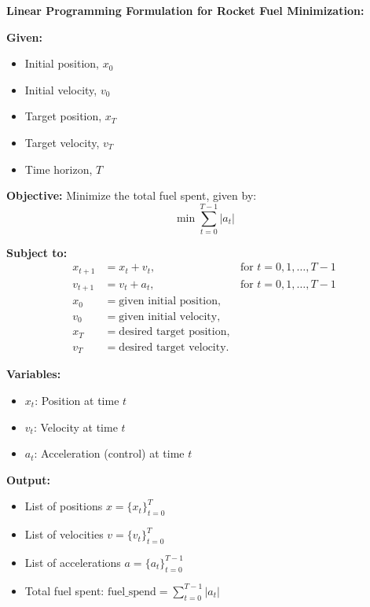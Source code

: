 \documentclass{article}
\begin{document}
\textbf{Linear Programming Formulation for Rocket Fuel Minimization:}

\textbf{Given:}
\begin{itemize}
    \item Initial position, \( x_0 \)
    \item Initial velocity, \( v_0 \)
    \item Target position, \( x_T \)
    \item Target velocity, \( v_T \)
    \item Time horizon, \( T \)
\end{itemize}

\textbf{Objective:}
Minimize the total fuel spent, given by:
\[
\min \sum_{t=0}^{T-1} |a_t|
\]

\textbf{Subject to:}
\begin{align*}
x_{t+1} &= x_t + v_t, & \text{for } t = 0, 1, \ldots, T-1\\
v_{t+1} &= v_t + a_t, & \text{for } t = 0, 1, \ldots, T-1\\
x_0 &= \text{given initial position},\\
v_0 &= \text{given initial velocity},\\
x_T &= \text{desired target position},\\
v_T &= \text{desired target velocity}.
\end{align*}

\textbf{Variables:}
\begin{itemize}
    \item \( x_t \): Position at time \( t \)
    \item \( v_t \): Velocity at time \( t \)
    \item \( a_t \): Acceleration (control) at time \( t \)
\end{itemize}

\textbf{Output:}
\begin{itemize}
    \item List of positions \( x = \{x_t\}_{t=0}^{T} \)
    \item List of velocities \( v = \{v_t\}_{t=0}^{T} \)
    \item List of accelerations \( a = \{a_t\}_{t=0}^{T-1} \)
    \item Total fuel spent: \( \text{fuel\_spend} = \sum_{t=0}^{T-1} |a_t| \)
\end{itemize}
\end{document}
